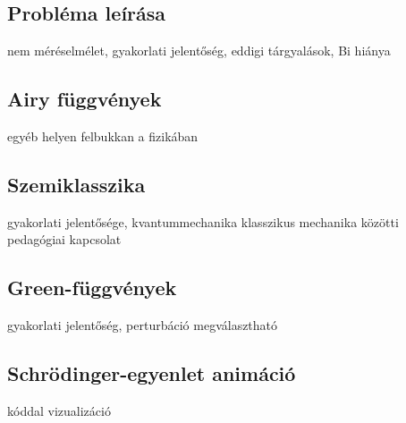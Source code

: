 \subsection{Probléma leírása}
nem méréselmélet, gyakorlati jelentőség, eddigi tárgyalások, Bi hiánya
\subsection{Airy függvények}
egyéb helyen felbukkan a fizikában
\subsection{Szemiklasszika}
gyakorlati jelentősége, kvantummechanika klasszikus mechanika közötti pedagógiai kapcsolat
\subsection{Green-függvények}
gyakorlati jelentőség, perturbáció megválasztható
\subsection{Schrödinger-egyenlet animáció}
kóddal vizualizáció
